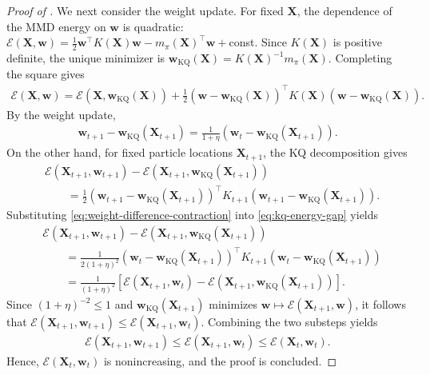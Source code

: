 \begin{proof}[Proof of ]
We next consider the weight update. For fixed $\bm{X}$, the dependence of the MMD energy on $\bm{w}$ is quadratic:
$\mathcal{E}(\bm{X},\bm{w})=\frac12 \bm{w}^\top K(\bm{X})\bm{w}-m_\pi(\bm{X})^\top \bm{w}+$const. Since $K(\bm{X})$ is positive definite, the unique minimizer is
$\bm{w}_{\mathrm{KQ}}(\bm{X})=K(\bm{X})^{-1}m_\pi(\bm{X})$.
Completing the square gives
\begin{align}
\mathcal{E}(\bm{X},\bm{w})
=
\mathcal{E}\left(\bm{X},\bm{w}_{\mathrm{KQ}}(\bm{X})\right)
+
\frac12 \left( \bm{w}-\bm{w}_{\mathrm{KQ}}(\bm{X}) \right)^\top K(\bm{X}) \left( \bm{w}-\bm{w}_{\mathrm{KQ}}(\bm{X}) \right).  
\label{eq:mmd-kq-decomposition}
\end{align}
By the weight update,
\begin{align}
\bm{w}_{t+1}
-
\bm{w}_{\mathrm{KQ}}(\bm{X}_{t+1})
=
\frac{1}{1+\eta}
\left(
\bm{w}_t
-
\bm{w}_{\mathrm{KQ}}(\bm{X}_{t+1})
\right).
\label{eq:weight-difference-contraction}
\end{align}
On the other hand, for fixed particle locations $\bm{X}_{t+1}$, the KQ decomposition gives
\begin{align}
&
\mathcal{E}(\bm{X}_{t+1},\bm{w}_{t+1})
-
\mathcal{E}\left(
\bm{X}_{t+1},
\bm{w}_{\mathrm{KQ}}(\bm{X}_{t+1})
\right)
\nonumber\\
&\qquad=
\frac{1}{2}
\left(
\bm{w}_{t+1}
-
\bm{w}_{\mathrm{KQ}}(\bm{X}_{t+1})
\right)^\top
K_{t+1}
\left(
\bm{w}_{t+1}
-
\bm{w}_{\mathrm{KQ}}(\bm{X}_{t+1})
\right).
\label{eq:kq-energy-gap}
\end{align}
Substituting \eqref{eq:weight-difference-contraction} into
\eqref{eq:kq-energy-gap} yields
\begin{align}
&
\mathcal{E}(\bm{X}_{t+1},\bm{w}_{t+1})
-
\mathcal{E}\left(
\bm{X}_{t+1},
\bm{w}_{\mathrm{KQ}}(\bm{X}_{t+1})
\right)
\nonumber\\
&\qquad=
\frac{1}{2(1+\eta)^2}
\left(
\bm{w}_t
-
\bm{w}_{\mathrm{KQ}}(\bm{X}_{t+1})
\right)^\top
K_{t+1}
\left(
\bm{w}_t
-
\bm{w}_{\mathrm{KQ}}(\bm{X}_{t+1})
\right)
\nonumber\\
&\qquad=
\frac{1}{(1+\eta)^2}
\left[
\mathcal{E}(\bm{X}_{t+1},\bm{w}_t)
-
\mathcal{E}\left(
\bm{X}_{t+1},
\bm{w}_{\mathrm{KQ}}(\bm{X}_{t+1})
\right)
\right].
\label{eq:kq-weight-contraction}
\end{align}
Since $(1+\eta)^{-2}\leq1$ and $\bm{w}_{\mathrm{KQ}}(\bm{X}_{t+1})$ minimizes
$\bm{w}\mapsto\mathcal{E}(\bm{X}_{t+1},\bm{w})$, it follows that
$\mathcal{E}(\bm{X}_{t+1},\bm{w}_{t+1})
\leq
\mathcal{E}(\bm{X}_{t+1},\bm{w}_t)$.
Combining the two substeps yields
\begin{align}
\mathcal{E}(\bm{X}_{t+1},\bm{w}_{t+1})
\leq
\mathcal{E}(\bm{X}_{t+1},\bm{w}_t)
\leq
\mathcal{E}(\bm{X}_t,\bm{w}_t).
\label{eq:full-wift-descent}
\end{align}
Hence, $\mathcal{E}(\bm{X}_t,\bm{w}_t)$ is nonincreasing, and the proof is concluded.
\end{proof}

